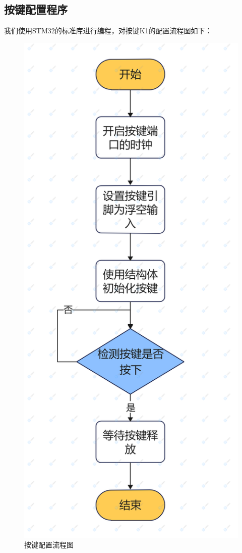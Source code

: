 \documentclass[UTF8,a4paper,11pt]{article}
\begin{document}
\subsection{按键配置程序}
我们使用STM32的标准库进行编程，对按键K1的配置流程图如下：
\begin{figure}[htbp]
    \centering
    \includegraphics[scale=0.15]{p13.png}
    \caption{按键配置流程图}
\end{figure} 
\end{document}
